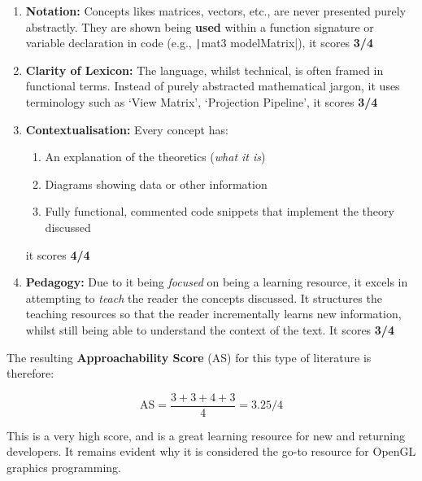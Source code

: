 \begin{enumerate}
    \item \textbf{Notation:} Concepts likes matrices, vectors, etc., are never presented purely abstractly. They are shown being \textbf{used} within a function signature or variable declaration in code (e.g., \texttt|mat3  modelMatrix|), it scores \textbf{3/4}
    \item \textbf{Clarity of Lexicon:} The language, whilst technical, is often framed in functional terms. Instead of purely abstracted mathematical jargon, it uses terminology such as `View Matrix', `Projection Pipeline', it scores \textbf{3/4}
    \item \textbf{Contextualisation:} Every concept has:
        \begin{enumerate}
            \item An explanation of the theoretics (\textit{what it is})
            \item Diagrams showing data or other information
            \item Fully functional, commented code snippets that implement the theory discussed
        \end{enumerate}
        it scores \textbf{4/4}
    \item \textbf{Pedagogy:} Due to it being \textit{focused} on being a learning resource, it excels in attempting to \textit{teach} the reader
    the concepts discussed. It structures the teaching resources so that the reader incrementally learns new information, whilst still being able to understand the context
    of the text. It scores \textbf{3/4}
\end{enumerate}

The resulting \textbf{Approachability Score} (AS) for this type of literature is therefore:

\begin{equation}
    \text{AS} = \frac{3 + 3 + 4 + 3}{4} = 3.25 / 4
\end{equation}

This is a very high score, and is a great learning resource for new and returning developers. It remains evident why it is considered the go-to resource for
OpenGL graphics programming.